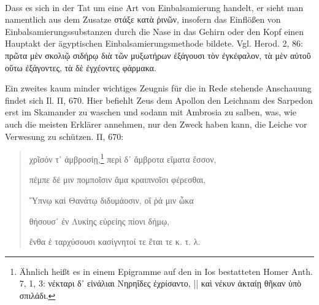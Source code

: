 \documentclass[a4paper, 11pt, oneside]{article}
\begin{document}
\paragraph{}
Dass es sich in der Tat um eine Art von Einbalsamierung handelt, er sieht man namentlich aus dem Zusatze στάξε κατὰ ῥινῶν, insofern das Einflößen von Einbalsamierungssubstanzen durch die Nase in das Gehirn oder den Kopf einen Hauptakt der ägyptischen Einbalsamierungsmethode bildete. Vgl. Herod. 2, 86: πρῶτα μὲν σκολιῷ σιδήρῳ διὰ τῶν μυξωτήρων ἐξάγουσι τὸν ἐγκέφαλον, τὰ μὲν αὐτοῦ οὕτω ἐξάγοντες, τὰ δὲ ἐγχέοντες φάρμακα.

Ein zweites kaum minder wichtiges Zeugnis für die in Rede stehende Anschauung findet sich Il. Π, 670. Hier befiehlt Zeus dem Apollon den Leichnam des Sarpedon erst im Skamander zu waschen und sodann mit Ambrosia zu salben, was, wie auch die meisten Erklärer annehmen, nur den Zweck haben kann, die Leiche vor Verwesung zu schützen. Π, 670:
\begin{quotation}
χρῖσόν τ᾿ ἀμβροσίῃ,\footnote{Ähnlich heißt es in einem Epigramme auf den in Ios bestatteten Homer Anth. 7, 1, 3: νέκταρι δ᾽ εἰνάλιαι Νηρηΐδες ἐχρίσαντο, || καὶ νέκυν ἀκταίῃ θῆκαν ὑπὸ σπιλάδι.} περὶ δ᾽ ἄμβροτα εἴματα ἕσσον,

πέμπε δέ μιν πομποῖσιν ἅμα κραιπνοῖσι φέρεσθαι,

Ὕπνῳ καὶ Θανάτῳ διδυμάοσιν, οἵ ῥά μιν ὦκα

θήσουσ᾽ ἐν Λυκίης εὐρείης πίονι δήμῳ,

ἔνθα ἑ ταρχύσουσι κασίγνητοί τε ἔται τε κ. τ. λ.
\end{quotation}
\end{document}
